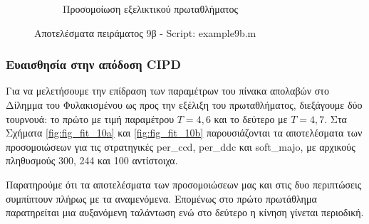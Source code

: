 \documentclass[12pt]{report}
\begin{document}
\begin{figure}[htbp]
\begin{subfigure}[b]{0.5\linewidth}
        \caption{Προσομοίωση εξελικτικού πρωταθλήματος}
        \label{fig:fig_fit_9b_c}
        
    \end{subfigure}

    \caption{Αποτελέσματα πειράματος 9β - \foreignlanguage{english}{Script: example9b.m}}
    \label{fig:fig_fit_9b}
\end{figure}

\subsubsection{Ευαισθησία στην απόδοση \foreignlanguage{english}{CIPD} }
Για να μελετήσουμε την επίδραση των παραμέτρων του πίνακα απολαβών στο Δίλημμα του Φυλακισμένου ως προς την εξέλιξη του πρωταθλήματος, διεξάγουμε δύο τουρνουά: το πρώτο με τιμή παραμέτρου $T = 4{,}6$ και το δεύτερο με $T = 4{,}7$. Στα Σχήματα \ref{fig:fig_fit_10a} και \ref{fig:fig_fit_10b} παρουσιάζονται τα αποτελέσματα των προσομοιώσεων για τις στρατηγικές \foreignlanguage{english}{per\_ccd}, \foreignlanguage{english}{per\_ddc} και \foreignlanguage{english}{soft\_majo}, με αρχικούς πληθυσμούς 300, 244 και 100 αντίστοιχα.


Παρατηρούμε ότι τα αποτελέσματα των προσομοιώσεων μας και στις δυο περιπτώσεις συμπίπτουν πλήρως με τα αναμενόμενα. Επομένως στο πρώτο πρωτάθλημα παρατηρείται μια αυξανόμενη ταλάντωση ενώ στο δεύτερο η κίνηση γίνεται περιοδική.
\end{document}
